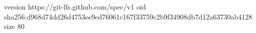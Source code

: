 version https://git-lfs.github.com/spec/v1
oid sha256:d968d74dd26d4753ee9ed76061c167f33759c2b9f34908db7d12a63730ab4128
size 80
